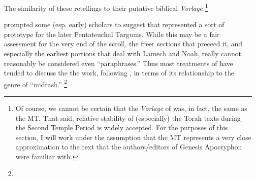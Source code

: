 The similarity of these retellings to their putative biblical \emph{Vorlage}%
\footnote{Of course, we cannot be certain that the \emph{Vorlage} of \ga was, in fact, the same as the MT. That said, relative stability of (especially) the Torah texts during the Second Temple Period is widely accepted. For the purposes of this section, I will work under the assumption that the MT represents a very close approximation to the text that the authors/editors of Genesis Apocryphon were familiar with.}

prompted some (esp. early) scholars to suggest that \ga represented a sort of prototype for the later Pentateuchal Targums.\autocite[193]{black1983} While this may be a fair assessment for the very end of the scroll, the freer sections that preceed it, and especially the earliest portions that deal with Lamech and Noah, really cannot reasonably be considered even ``paraphrases.'' Thus most treatments of \ga have tended to discuss the the work, following \vermes, in terms of its relationship to the genre of ``midrash.''\autocite{vermes1961}%
%
\footnote{}




